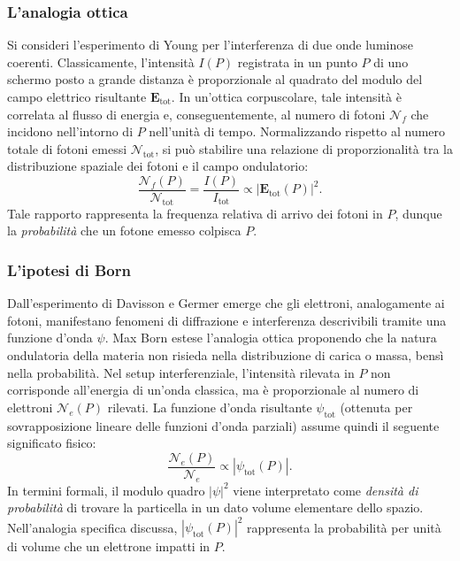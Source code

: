 \documentclass[a4paper,11pt]{report}
\begin{document}
\subsubsection{L'analogia ottica}
Si consideri l'esperimento di Young per l'interferenza di due onde luminose coerenti. Classicamente, l'intensità $I(P)$ registrata in un punto $P$ di uno schermo posto a grande distanza è proporzionale al quadrato del modulo del campo elettrico risultante $\bm{E}_{\text{tot}}$. In un'ottica corpuscolare, tale intensità è correlata al flusso di energia e, conseguentemente, al numero di fotoni $\mathcal{N}_f$ che incidono nell'intorno di $P$ nell'unità di tempo.
Normalizzando rispetto al numero totale di fotoni emessi $\mathcal{N}_{\text{tot}}$, si può stabilire una relazione di proporzionalità tra la distribuzione spaziale dei fotoni e il campo ondulatorio:
\begin{equation}
    \frac{\mathcal{N}_f(P)}{\mathcal{N}_{\text{tot}}} = \frac{I(P)}{I_{\text{tot}}} \propto |\bm{E}_{\text{tot}}(P)|^2.
\end{equation}
Tale rapporto rappresenta la frequenza relativa di arrivo dei fotoni in $P$, dunque la \textit{probabilità} che un fotone emesso colpisca $P$.

\subsubsection{L'ipotesi di Born}
Dall'esperimento di Davisson e Germer emerge che gli elettroni, analogamente ai fotoni, manifestano fenomeni di diffrazione e interferenza descrivibili tramite una funzione d'onda $\psi$.
Max Born estese l'analogia ottica proponendo che la natura ondulatoria della materia non risieda nella distribuzione di carica o massa, bensì nella probabilità.
Nel setup interferenziale, l'intensità rilevata in $P$ non corrisponde all'energia di un'onda classica, ma è proporzionale al numero di elettroni $\mathcal{N}_e(P)$ rilevati. La funzione d'onda risultante $\psi_{\text{tot}}$ (ottenuta per sovrapposizione lineare delle funzioni d'onda parziali) assume quindi il seguente significato fisico:
\begin{equation}
    \frac{\mathcal{N}_e(P)}{\mathcal{N}_e}  \propto |\psi_{\text{tot}}(P)|.
\end{equation}
In termini formali, il modulo quadro $|\psi|^2$ viene interpretato come \textit{densità di probabilità} di trovare la particella in un dato volume elementare dello spazio. Nell'analogia specifica discussa, $|\psi_{\text{tot}}(P)|^2$ rappresenta la probabilità per unità di volume che un elettrone impatti in $P$.
\end{document}
